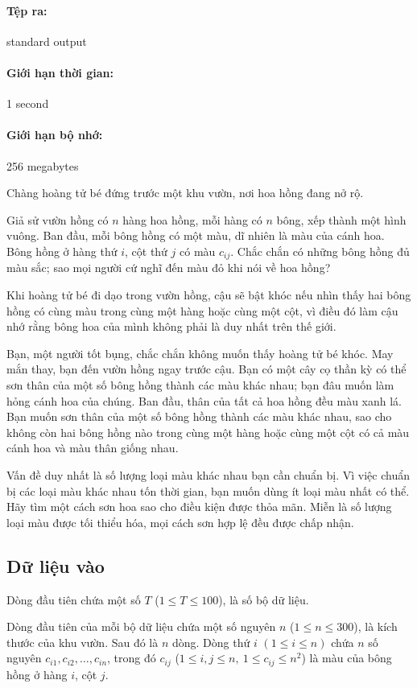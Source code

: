 \documentclass[11pt]{article}
\begin{document}
\paragraph{Tệp ra:} standard output
\paragraph{Giới hạn thời gian:} 1 second
\paragraph{Giới hạn bộ nhớ:} 256 megabytes

Chàng hoàng tử bé đứng trước một khu vườn, nơi hoa hồng đang nở rộ.

Giả sử vườn hồng có \(n\) hàng hoa hồng, mỗi hàng có \(n\) bông, xếp thành
một hình vuông. Ban đầu, mỗi bông hồng có một màu, dĩ nhiên là màu của cánh
hoa. Bông hồng ở hàng thứ \(i\), cột thứ \(j\) có màu \(c_{ij}\). Chắc chắn
có những bông hồng đủ màu sắc; sao mọi người cứ nghĩ đến màu đỏ khi nói về
hoa hồng?

Khi hoàng tử bé đi dạo trong vườn hồng, cậu sẽ bật khóc nếu nhìn thấy hai
bông hồng có cùng màu trong cùng một hàng hoặc cùng một cột, vì điều đó làm
cậu nhớ rằng bông hoa của mình không phải là duy nhất trên thế giới.

Bạn, một người tốt bụng, chắc chắn không muốn thấy hoàng tử bé khóc. May mắn
thay, bạn đến vườn hồng ngay trước cậu. Bạn có một cây cọ thần kỳ có thể sơn
thân của một số bông hồng thành các màu khác nhau; bạn đâu muốn làm hỏng cánh
hoa của chúng. Ban đầu, thân của tất cả hoa hồng đều màu xanh lá. Bạn muốn
sơn thân của một số bông hồng thành các màu khác nhau, sao cho không còn hai
bông hồng nào trong cùng một hàng hoặc cùng một cột có cả màu cánh hoa và màu
thân giống nhau.

Vấn đề duy nhất là số lượng loại màu khác nhau bạn cần chuẩn bị. Vì việc chuẩn
bị các loại màu khác nhau tốn thời gian, bạn muốn dùng ít loại màu nhất có
thể. Hãy tìm một cách sơn hoa sao cho điều kiện được thỏa mãn. Miễn là số
lượng loại màu được tối thiểu hóa, mọi cách sơn hợp lệ đều được chấp nhận.

\subsection*{Dữ liệu vào}

Dòng đầu tiên chứa một số \(T\) (\(1\le T\le 100\)), là số bộ dữ liệu.

Dòng đầu tiên của mỗi bộ dữ liệu chứa một số nguyên \(n\) (\(1\le n\le 300\)),
là kích thước của khu vườn. Sau đó là \(n\) dòng. Dòng thứ \(i\)
\((1\le i\le n)\) chứa \(n\) số nguyên \(c_{i1},c_{i2},\ldots,c_{in}\), trong
đó \(c_{ij}\) (\(1\le i,j\le n,\ 1\le c_{ij}\le n^2\)) là màu của bông hồng ở
hàng \(i\), cột \(j\).
\end{document}
